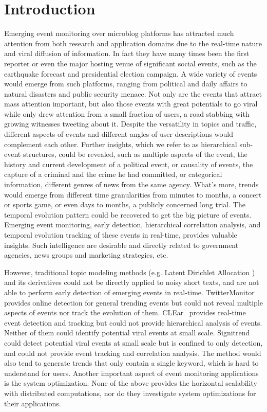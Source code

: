 \section{Introduction}

Emerging event monitoring over microblog platforms has attracted much attention from both research and application domains due to the real-time nature and viral diffusion of information.
In fact they have many times been the first reporter or even the major hosting venue of significant social events, such as the earthquake forecast and presidential election campaign.
A wide variety of events would emerge from such platforms, ranging from political and daily affairs to natural disasters and public security menace.
Not only are the events that attract mass attention important, but also those events with great potentials to go viral while only drew attention from a small fraction of users, \eg a road stabbing with growing witnesses tweeting about it.
Despite the versatility in topics and traffic, different aspects of events and different angles of user descriptions would complement each other.
Further insights, which we refer to as hierarchical sub-event structures, could be revealed, such as multiple aspects of the event, \eg the history and current development of a political event, or causality of events, \eg the capture of a criminal and the crime he had committed, or categorical information, \eg different genres of news from the same agency.
What's more, trends would emerge from different time granularities from minutes to months, \eg a concert or sports game, or even days to months, \eg a publicly concerned long trial.
The temporal evolution pattern could be recovered to get the big picture of events.
Emerging event monitoring, \ie early detection, hierarchical correlation analysis, and temporal evolution tracking of these events in real-time, provides valuable insights. %
Such intelligence are desirable and directly related to government agencies, news groups and marketing strategies, etc.

However, traditional topic modeling methods (e.g. Latent Dirichlet Allocation%
) and its derivatives could not be directly applied to noisy short texts, and are not able to perform early detection of emerging events in real-time.
TwitterMonitor~\cite{ mathioudakis2010twittermonitor} provides online detection for general trending events but could not reveal multiple aspects of events nor track the evolution of them.
CLEar~\cite{xie2014clear} provides real-time event detection and tracking but could not provide hierarchical analysis of events.
Neither of them could identify potential viral events at small scale.
Signitrend~\cite{schubert2014signitrend} could detect potential viral events at small scale but is confined to only detection, and could not provide event tracking and correlation analysis.
The method would also tend to generate trends that only contain a single keyword, which is hard to understand for users.
Another important aspect of event monitoring applications is the system optimization.
None of the above provides the horizontal scalability with distributed computations, nor do they investigate system optimizations for their applications.


